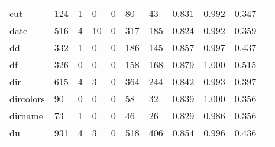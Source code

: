 \begin{longtable}{lp{1.10cm}p{1.10cm}p{1.10cm}p{1.10cm}p{1.10cm}p{1.10cm}p{1.10cm}p{1.10cm}p{1.10cm}p{1.10cm}}
cut       &                    124 &                                  1 &                                 0 &                                0 &                                80 &                              43 &                          0.831 &                                 0.992 &                               0.347 \\
date      &                    516 &                                  4 &                                10 &                                0 &                               317 &                             185 &                          0.824 &                                 0.992 &                               0.359 \\
dd        &                    332 &                                  1 &                                 0 &                                0 &                               186 &                             145 &                          0.857 &                                 0.997 &                               0.437 \\
df        &                    326 &                                  0 &                                 0 &                                0 &                               158 &                             168 &                          0.879 &                                 1.000 &                               0.515 \\
dir       &                    615 &                                  4 &                                 3 &                                0 &                               364 &                             244 &                          0.842 &                                 0.993 &                               0.397 \\
dircolors &                     90 &                                  0 &                                 0 &                                0 &                                58 &                              32 &                          0.839 &                                 1.000 &                               0.356 \\
dirname   &                     73 &                                  1 &                                 0 &                                0 &                                46 &                              26 &                          0.829 &                                 0.986 &                               0.356 \\
du        &                    931 &                                  4 &                                 3 &                                0 &                               518 &                             406 &                          0.854 &                                 0.996 &                               0.436 \\

\end{longtable}

